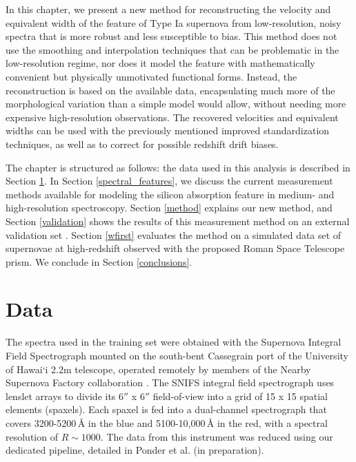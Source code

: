 In this chapter, we present a new method for reconstructing the velocity and equivalent width of the \siliconii{} feature of Type Ia supernova from low-resolution, noisy spectra that is more robust and less susceptible to bias. This method does not use the smoothing and interpolation techniques that can be problematic in the low-resolution regime, nor does it model the feature with mathematically convenient but physically unmotivated functional forms. Instead, the reconstruction is based on the available data, encapsulating much more of the morphological variation than a simple model would allow, without needing more expensive high-resolution observations. The recovered velocities and equivalent widths can be used with the previously mentioned improved standardization techniques, as well as to correct for possible redshift drift biases.

The chapter is structured as follows: the data used in this analysis is described in Section \ref{data}. In Section \ref{spectral_features}, we discuss the current measurement methods available for modeling the silicon absorption feature in medium- and high-resolution spectroscopy. Section \ref{method} explains our new method, and Section \ref{validation} shows the results of this measurement method on an external validation set \citep[BSNIP,][]{silverman_berkeley_2012}. Section \ref{wfirst} evaluates the method on a simulated data set of supernovae at high-redshift observed with the proposed Roman Space Telescope prism. We conclude in Section \ref{conclusions}.

\section{Data}
\label{data}
The spectra used in the training set were obtained with the Supernova Integral Field Spectrograph \citep[SNIFS,][]{lantz_snifs_2004} mounted on  the south-bent Cassegrain port of the University of Hawai`i 2.2m telescope, operated remotely by members of the Nearby Supernova Factory collaboration \citep[SNfactory,][]{aldering_overview_2002}. The SNIFS integral field spectrograph uses lenslet arrays to divide its 6$''$ x 6$''$ field-of-view into a grid of 15 x 15 spatial elements (spaxels). Each spaxel is fed into a dual-channel spectrograph that covers 3200-5200\,\AA{} in the blue and 5100-10,000\,\AA{} in the red, with a spectral resolution of $R \sim 1000$. The data from this instrument was reduced using our dedicated pipeline, detailed in Ponder et al. (in preparation).


